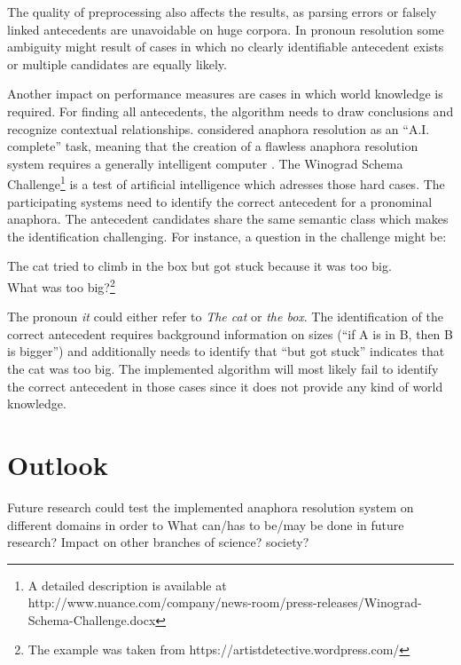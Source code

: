 The quality of preprocessing also affects the results, as parsing errors or falsely linked antecedents are unavoidable on huge corpora. In pronoun resolution some ambiguity might result of cases in which no clearly identifiable antecedent exists or multiple candidates are equally likely. 

Another impact on performance measures are cases in which world knowledge is required. For finding all antecedents, the algorithm needs to draw conclusions and recognize contextual relationships. \cite{baldwin1997cogniac} considered anaphora resolution as an ``A.I. complete'' task, meaning that the creation of a flawless anaphora resolution system requires a generally intelligent computer \citep{shapiro1992encyclopedia}. The Winograd Schema Challenge\footnote{A detailed description is available at http://www.nuance.com/company/news-room/press-releases/Winograd-Schema-Challenge.docx} is a test of artificial intelligence which adresses those hard cases. The participating systems need to identify the correct antecedent for a pronominal anaphora. The antecedent candidates share the same semantic class which makes the identification challenging. For instance, a question in the challenge might be:
\begin{addmargin}[25pt]{25pt}
The cat tried to climb in the box but got stuck because it was too big.\\ What was too big?\footnote{The example was taken from https://artistdetective.wordpress.com/}
\end{addmargin}

The pronoun \textit{it} could either refer to \textit{The cat} or \textit{the box}. The identification of the correct antecedent requires background information on sizes (``if A is in B, then B is bigger'') and additionally needs to identify that ``but got stuck'' indicates that the cat was too big. The implemented algorithm will most likely fail to identify the correct antecedent in those cases since it does not provide any kind of world knowledge.

\section{Outlook}
Future research could test the implemented anaphora resolution system on different domains in order to 
What can/has to be/may be done in future research? Impact on other branches of science? society?